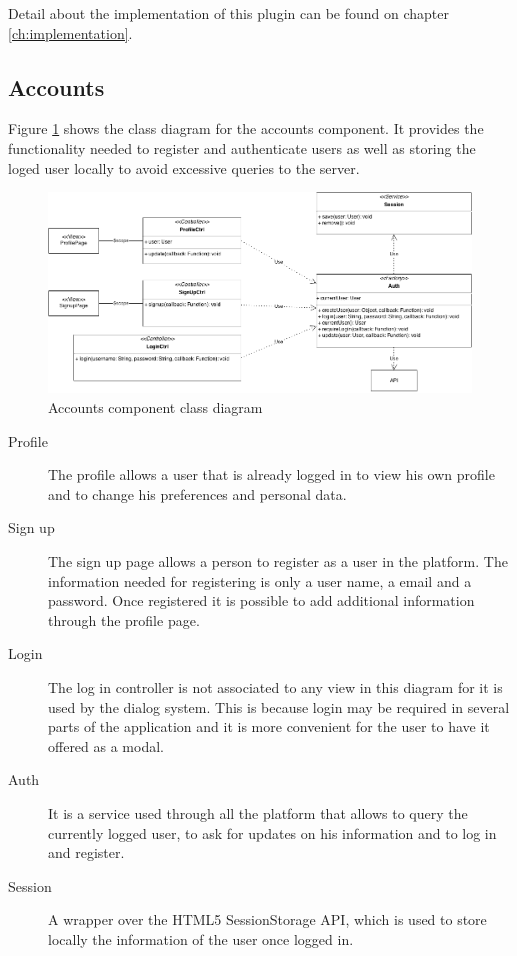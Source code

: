 Detail about the implementation of this plugin can be found on chapter \ref{ch:implementation}.

\FloatBarrier
\subsection{Accounts}

Figure \ref{fig:accounts-component} shows the class diagram for the accounts component. It provides the functionality needed to register and authenticate users as well as storing the loged user locally to avoid excessive queries to the server.

\begin{figure}[ht]
  \centering
  \includegraphics[width=.8\textwidth]{fig/accounts-component}
  \caption{Accounts component class diagram}
  \label{fig:accounts-component}
\end{figure}

\begin{description}
\item[Profile] The profile allows a user that is already logged in to view his own profile and to change his preferences and personal data.
\item[Sign up] The sign up page allows a person to register as a user in the platform. The information needed for registering is only a user name, a email and a password. Once registered it is possible to add additional information through the profile page. 
\item[Login] The log in controller is not associated to any view in this diagram for it is used by the dialog system. This is because login may be required in several parts of the application and it is more convenient for the user to have it offered as a modal.
\item[Auth] It is a service used through all the platform that allows to query the currently logged user, to ask for updates on his information and to log in and register.
\item[Session] A wrapper over the HTML5 SessionStorage API, which is used to store locally the information of the user once logged in.
\end{description}

